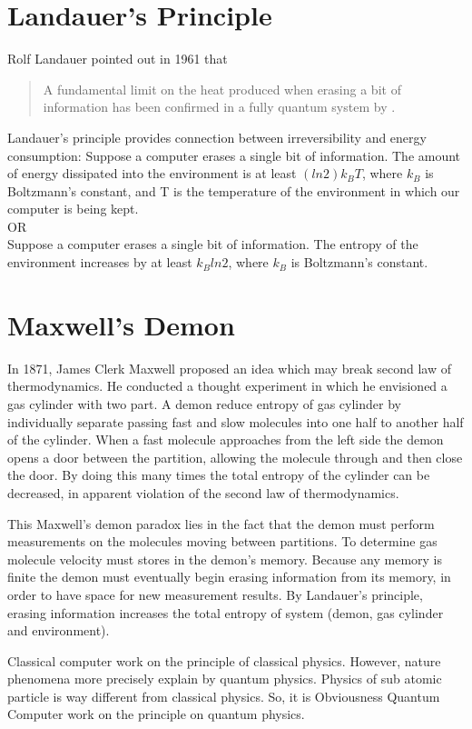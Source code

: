 \documentclass[11.5pt, paper=a4]{article}
\theoremstyle{definition}
\numberwithin{theorem}{section}
\begin{document}
\section{Landauer's Principle}
Rolf Landauer pointed out in 1961 that\begin{quote}
    A fundamental limit on the heat produced when erasing a bit of information has been confirmed in a fully quantum system by \citet{landauer1961irreversibility}.
\end{quote}

Landauer's principle provides connection between irreversibility and energy consumption: Suppose a computer erases a single bit of information. The amount of energy dissipated into the environment is at least $(ln 2)k_B T$, where $k_B$ is Boltzmann’s constant, and T
is the temperature of the environment in which our computer is being kept.\\
OR\\
Suppose a computer erases a single bit of information. The entropy of the environment increases by at least $k_B ln2$, where $k_B$ is Boltzmann’s constant.

\section{Maxwell's Demon}
In 1871, James Clerk Maxwell proposed an idea which may break second law of thermodynamics. He conducted a thought experiment in which he envisioned a gas cylinder with two part.
A demon reduce entropy of gas cylinder by individually separate passing fast and slow molecules into one half to another half of the cylinder.
When a fast molecule approaches from the left side the demon opens a door between the partition, allowing the molecule through and then close the door.
By doing this many times the total entropy of the cylinder can be decreased, in apparent violation of the second law of thermodynamics.

This Maxwell's demon paradox lies in the fact that the demon must perform measurements on the molecules moving between partitions.
To determine gas molecule velocity must stores in the demon's memory. Because any memory is finite the demon must eventually begin erasing information from its memory, in order to have space for new measurement results.
By Landauer's principle, erasing information increases the total entropy of system (demon, gas cylinder and environment).

Classical computer work on the principle of classical physics. However, nature phenomena more precisely explain by quantum physics. Physics of sub atomic particle is way different from classical physics.
So, it is Obviousness Quantum Computer work on the principle on quantum physics.
\end{document}
